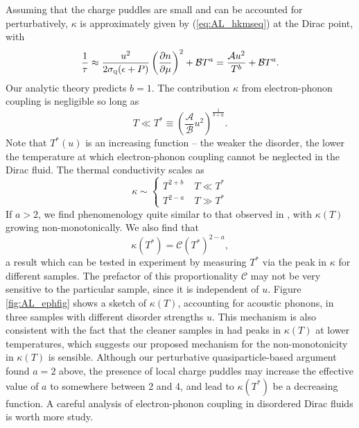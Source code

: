 Assuming that the charge puddles are small and can be accounted for perturbatively,  $\kappa$ is approximately given by (\ref{eq:AL_hkmseq}) at the Dirac point, with \begin{equation}
\frac{1}{\tau} \approx  \frac{u^2}{2\sigma_{\textsc{q}} (\epsilon+P)}\left(\frac{\partial n}{\partial \mu}\right)^2 +  \mathcal{B}T^a = \frac{\mathcal{A} u^2}{T^b} + \mathcal{B}T^a.
\end{equation}
Our analytic theory predicts $b=1$.  The contribution $\kappa$ from electron-phonon coupling is negligible so long as \begin{equation}
T \ll  T^* \equiv  \left(\frac{\mathcal{A}}{\mathcal{B}}u^2\right)^{\frac{1}{b+a}}.
\end{equation}
Note that $T^*(u)$ is an increasing function -- the weaker the disorder, the lower the temperature at which electron-phonon coupling cannot be neglected in the Dirac fluid.   The thermal conductivity scales as \begin{equation}
\kappa \sim \left\lbrace\begin{array}{ll}  T^{2+b} &\  T\ll T^* \\ T^{2-a} &\ T\gg T^*\end{array}\right.
\end{equation}
If $a>2$, we find phenomenology quite similar to that observed in \cite{crossno_observation_2016}, with $\kappa(T)$ growing non-monotonically.   We also find that \begin{equation}
\kappa(T^*) = \mathcal{C} (T^*)^{2-a},
\end{equation}
a result which can be tested in experiment by measuring $T^*$ via the peak in $\kappa$ for different samples.  The prefactor of this proportionality $\mathcal{C}$ may not be very sensitive to the particular sample, since it is independent of $u$.   Figure \ref{fig:AL_ephfig} shows a sketch of $\kappa(T)$, accounting for acoustic phonons, in three samples with different disorder strengths $u$.   This mechanism is also consistent with the fact that the cleaner samples in \cite{crossno_observation_2016} had peaks in $\kappa(T)$ at lower temperatures, which suggests our proposed mechanism for the non-monotonicity in $\kappa(T)$ is sensible.   Although our perturbative quasiparticle-based argument found $a=2$ above, the presence of local charge puddles may increase the effective value of $a$ to somewhere between 2 and 4, and lead to $\kappa(T^*)$ be a decreasing function.   A careful analysis of electron-phonon coupling in disordered Dirac fluids is worth more study.   

